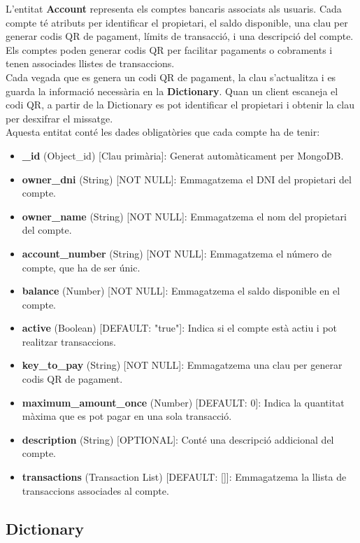 \documentclass[a4paper,12pt,twoside]{ThesisStyle}
\begin{document}
L'entitat \textbf{Account} representa els comptes bancaris associats als usuaris. Cada compte té atributs per identificar el propietari, el saldo disponible, una clau per generar codis QR de pagament, límits de transacció, i una descripció del compte. Els comptes poden generar codis QR per facilitar pagaments o cobraments i tenen associades llistes de transaccions.\\

Cada vegada que es genera un codi QR de pagament, la clau s'actualitza i es guarda la informació necessària en la \textbf{Dictionary}. Quan un client escaneja el codi QR, a partir de la Dictionary es pot identificar el propietari i obtenir la clau per desxifrar el missatge.\\

Aquesta entitat conté les dades obligatòries que cada compte ha de tenir:

\begin{itemize}
    \item \textbf{\_id} (Object\_id) [Clau primària]: Generat automàticament per MongoDB.
    \item \textbf{owner\_dni} (String) [NOT NULL]: Emmagatzema el DNI del propietari del compte.
    \item \textbf{owner\_name} (String) [NOT NULL]: Emmagatzema el nom del propietari del compte.
    \item \textbf{account\_number} (String) [NOT NULL]: Emmagatzema el número de compte, que ha de ser únic.
    \item \textbf{balance} (Number) [NOT NULL]: Emmagatzema el saldo disponible en el compte.
    \item \textbf{active} (Boolean) [DEFAULT: "true"]: Indica si el compte està actiu i pot realitzar transaccions.
    \item \textbf{key\_to\_pay} (String) [NOT NULL]: Emmagatzema una clau per generar codis QR de pagament.
    \item \textbf{maximum\_amount\_once} (Number) [DEFAULT: 0]: Indica la quantitat màxima que es pot pagar en una sola transacció.
    \item \textbf{description} (String) [OPTIONAL]: Conté una descripció addicional del compte.
    \item \textbf{transactions} (Transaction List) [DEFAULT: []]: Emmagatzema la llista de transaccions associades al compte.
\end{itemize}




\subsection{Dictionary}
\label{subsec: Dictionary}
\end{document}
